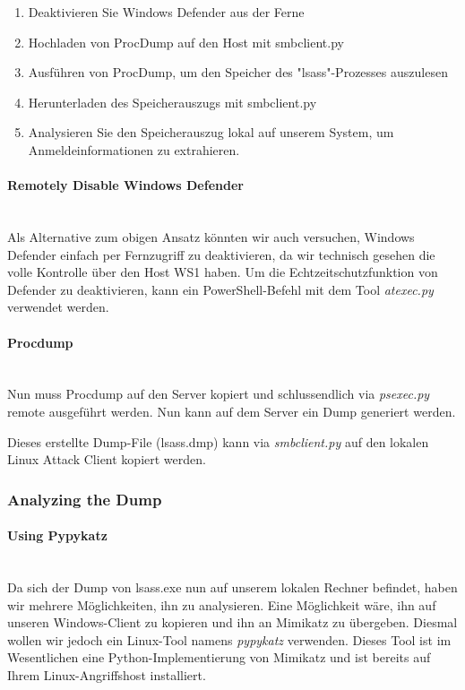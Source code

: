 \begin{enumerate}
    \item Deaktivieren Sie Windows Defender aus der Ferne
    \item Hochladen von ProcDump auf den Host mit smbclient.py
    \item Ausführen von ProcDump, um den Speicher des "lsass"-Prozesses auszulesen
    \item Herunterladen des Speicherauszugs mit smbclient.py
    \item Analysieren Sie den Speicherauszug lokal auf unserem System, um Anmeldeinformationen zu extrahieren.
\end{enumerate}

\paragraph{Remotely Disable Windows Defender}\mbox{} \\
Als Alternative zum obigen Ansatz könnten wir auch versuchen, Windows Defender einfach per Fernzugriff zu deaktivieren, da wir technisch gesehen die volle Kontrolle über den Host WS1 haben.
Um die Echtzeitschutzfunktion von Defender zu deaktivieren, kann ein PowerShell-Befehl mit dem Tool \textcolor{OSTPink}{\textit{atexec.py}} verwendet werden.

\paragraph{Procdump}\mbox{} \\
Nun muss Procdump auf den Server kopiert und schlussendlich via \textcolor{OSTPink}{\textit{psexec.py}} remote ausgeführt werden.
Nun kann auf dem Server ein Dump generiert werden.

Dieses erstellte Dump-File (lsass.dmp) kann via \textcolor{OSTPink}{\textit{smbclient.py}} auf den lokalen Linux Attack Client kopiert werden.

\subsubsection{Analyzing the Dump}

\paragraph{Using Pypykatz}\mbox{} \\
Da sich der Dump von lsass.exe nun auf unserem lokalen Rechner befindet, haben wir mehrere Möglichkeiten, ihn zu analysieren. Eine Möglichkeit wäre, ihn auf unseren Windows-Client zu kopieren und ihn an Mimikatz zu übergeben. Diesmal wollen wir jedoch ein Linux-Tool namens \textcolor{OSTPink}{\textit{pypykatz}} verwenden.
Dieses Tool ist im Wesentlichen eine Python-Implementierung von Mimikatz und ist bereits auf Ihrem Linux-Angriffshost installiert.\\

